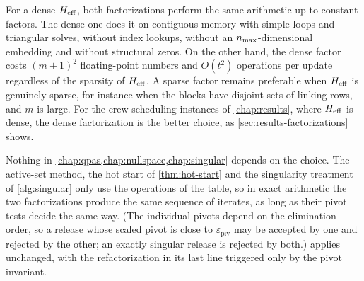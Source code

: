 For a dense $H_{\mathrm{eff}}$, both factorizations perform the same arithmetic up to constant factors. The
dense one does it on contiguous memory with simple loops and triangular solves, without index
lookups, without an $n_{\max}$-dimensional embedding and without structural zeros. On the other
hand, the dense factor costs $(m+1)^2$ floating-point numbers and $O(t^2)$ operations per update
regardless of the sparsity of $H_{\mathrm{eff}}$. A sparse factor remains preferable when $H_{\mathrm{eff}}$ is
genuinely sparse, for instance when the blocks have disjoint sets of linking rows, and $m$ is
large. For the crew scheduling instances of \cref{chap:results}, where $H_{\mathrm{eff}}$ is dense, the
dense factorization is the better choice, as \cref{sec:results-factorizations} shows.

\medskip

Nothing in \cref{chap:qpas,chap:nullspace,chap:singular} depends on the choice. The
active-set method, the hot start of \cref{thm:hot-start} and the singularity treatment of
\cref{alg:singular} only use the operations of the table, so in exact arithmetic the two factorizations
produce the same sequence of iterates, as long as their pivot tests decide the same way. (The
individual pivots depend on the elimination order, so a release whose scaled pivot is close to
$\varepsilon_{\mathrm{piv}}$ may be accepted by one and rejected by the other; an exactly singular
release is rejected by both.)  applies unchanged, with the refactorization in
its last line triggered only by the pivot invariant.
